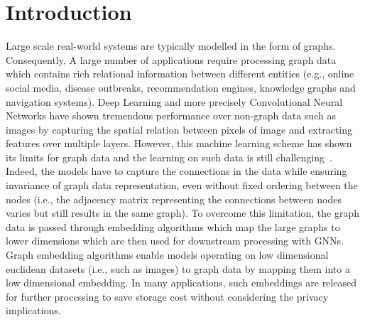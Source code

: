 \section{Introduction}\label{introduction}


Large scale real-world systems are typically modelled in the form of graphs.
Consequently, A large number of applications require processing graph data which contains rich relational information between different entities (e.g., online social media, disease outbreaks, recommendation engines, knowledge graphs and navigation systems).
Deep Learning and more precisely Convolutional Neural Networks have shown tremendous performance over non-graph data such as images by capturing the spatial relation between pixels of image and extracting features over multiple layers.
However, this machine learning scheme has shown its limits for graph data and the learning on such data is still challenging~\cite{zhou2018graph}.
Indeed, the models have to capture the connections in the data while ensuring invariance of graph data representation, even without fixed ordering between the nodes (i.e., the adjacency matrix representing the connections between nodes varies but still results in the same graph). %
To overcome this limitation, the graph data is passed through embedding algorithms which map the large graphs to lower dimensions which are then used for downstream processing with GNNs.
Graph embedding algorithms enable models operating on low dimensional euclidean datasets (i.e., such as images) to graph data by mapping them into a low dimensional embedding.
In many applications, such embeddings are released for further processing to save storage cost without considering the privacy implications.

